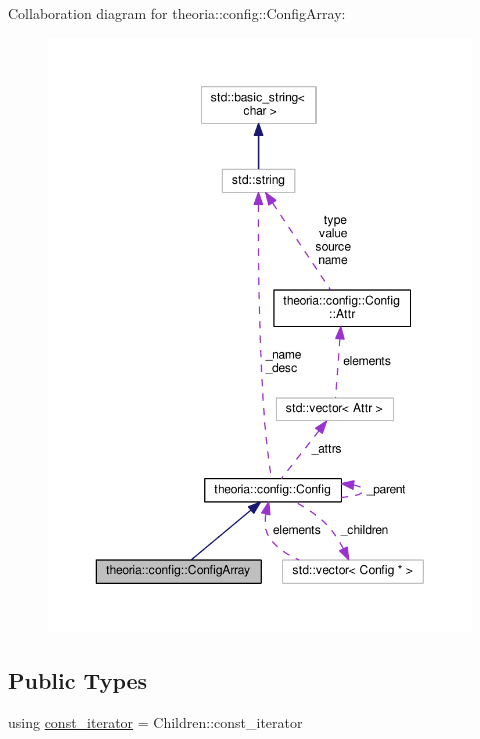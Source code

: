 Collaboration diagram for theoria\+:\+:config\+:\+:Config\+Array\+:\nopagebreak
\begin{figure}[H]
\begin{center}
\leavevmode
\includegraphics[width=350pt]{classtheoria_1_1config_1_1ConfigArray__coll__graph}
\end{center}
\end{figure}
\subsection*{Public Types}
\begin{DoxyCompactItemize}
\item 
using \hyperlink{classtheoria_1_1config_1_1ConfigArray_ace80948768681e7eb033825f4fe761f2}{const\+\_\+iterator} = Children\+::const\+\_\+iterator
\end{DoxyCompactItemize}
